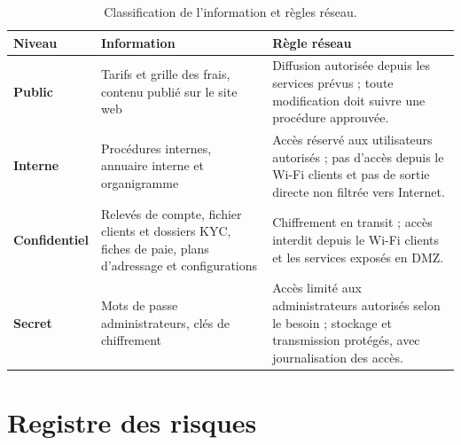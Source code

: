 \documentclass[11pt,a4paper]{article}
\begin{document}
	\small
	\begin{longtable}{p{2.5cm} p{6.5cm} p{6.5cm}}
		\caption{Classification de l'information et règles réseau.}\\
		\hline
		\textbf{Niveau} & \textbf{Information} & \textbf{Règle réseau}\\
		\hline
		\endhead
		\textbf{Public} &
		Tarifs et grille des frais, contenu publié sur le site web &
		Diffusion autorisée depuis les services prévus ; toute modification doit suivre une procédure approuvée. \\
		\hline
		
		\textbf{Interne} &
		Procédures internes, annuaire interne et organigramme &
		Accès réservé aux utilisateurs autorisés ; pas d'accès depuis le Wi-Fi clients et pas de sortie directe non filtrée vers Internet. \\
		\hline
		
		\textbf{Confidentiel} &
		Relevés de compte, fichier clients et dossiers KYC, fiches de paie, plans d'adressage et configurations &
		Chiffrement en transit ; accès interdit depuis le Wi-Fi clients et les services exposés en DMZ. \\
		\hline
		
		\textbf{Secret} &
		Mots de passe administrateurs, clés de chiffrement &
		Accès limité aux administrateurs autorisés selon le besoin ; stockage et transmission protégés, avec journalisation des accès. \\
	\hline
	\end{longtable}
	\normalsize
	
	\section{Registre des risques}
	
\end{document}
